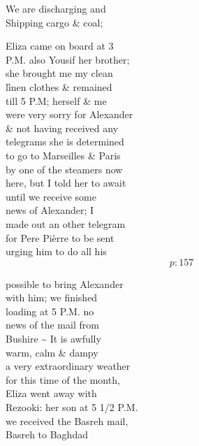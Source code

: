 \documentclass{report}
\begin{document}
	\par{
 	We are discharging and\ \\Shipping cargo \& coal;\ \\
	}

	\par{
 	Eliza came on board at 3\ \\P.M. also Yousif her brother;\ \\she brought me my clean\ \\lȋnen clothes \& remained\ \\till 5 P.M; herself \& me\ \\were very sorry for Alexander\ \\\& not having received any\ \\telegrams she is determined\ \\to go to Marseilles \& Paris\ \\by one of the steamers now\ \\here, but I told her to await\ \\until we receive some\ \\news of Alexander; I\ \\made out an other telegram\ \\for Pere Pièrre to be sent\ \\urging him to do all his\ \\
  \[p: 157 \]

	}





	\par{
 	possible to bring Alexander\ \\with him; we finished\ \\loading at 5 P.M. no\ \\news of the mail from\ \\Bushire \~{} It is awfully\ \\warm, calm \& dampy\ \\a very extraordinary weather\ \\for this time of the month,\ \\Eliza went away with\ \\Rezooki: her son at 5 1/2 P.M.\ \\we received the Basreh mail,\ \\Basreh to Baghdad\ \\
	}
\end{document}
